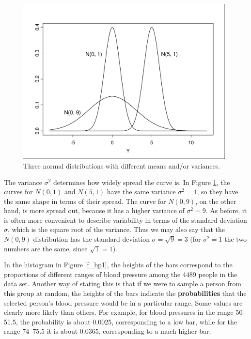 \begin{figure}
\caption{Three normal distributions with different means and/or
variances.}
\label{f_3norms}
\begin{center}
\includegraphics[width=11cm]{threenorms}
\end{center}
\vspace*{-2ex}
\end{figure}

The variance $\sigma^{2}$ determines how widely spread the curve is. In
Figure \ref{f_3norms}, the curves for $N(0, 1)$ and $N(5, 1)$ have the
same variance $\sigma^{2}=1$, so they have the same shape in
terms of their spread. The curve for $N(0, 9)$, on the other hand, is
more spread out, because it has a higher variance of $\sigma^{2}=9$. As
before, it is often more convenient to describe variability in terms of
the standard deviation $\sigma$, which is the square root of the
variance. Thus we may also say that the $N(0, 9)$ distribution has the
standard deviation $\sigma=\sqrt{9}=3$ (for $\sigma^{2}=1$ the two
numbers are the same, since $\sqrt{1}=1$).

In the histogram in Figure \ref{f_bp1}, the heights of the bars
correspond to the proportions of different ranges of blood
pressure among the 4489 people in the data set. Another way of stating
this is that if we were to sample a person from this group at random,
the heights of the
bars indicate the \textbf{probabilities} that the selected person's
blood pressure would be in a particular range. Some values are clearly
more likely than others. For example, for blood
pressures in the range 50--51.5, the probability is about 0.0025,
corresponding to a low bar, while for the range 74--75.5 it is about
0.0365, corresponding to a much higher bar.

